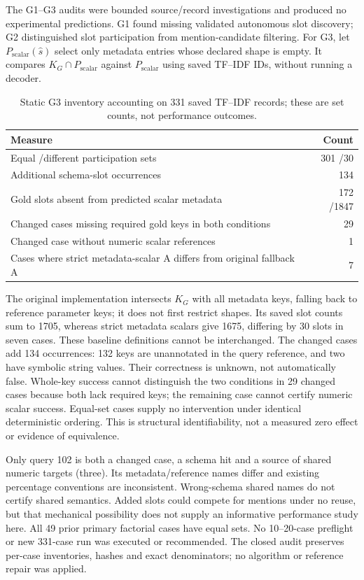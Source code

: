 The G1--G3 audits were bounded source/record investigations and produced no experimental predictions. G1 found missing validated autonomous slot discovery; G2 distinguished slot participation from mention-candidate filtering. For G3, let $P_{\mathrm{scalar}}(\hat{s})$ select only metadata entries whose declared shape is empty. It compares $K_G\cap P_{\mathrm{scalar}}$ against $P_{\mathrm{scalar}}$ using saved TF--IDF IDs, without running a decoder.

\begin{table}[htbp]\centering\small
\caption{Static G3 inventory accounting on 331 saved TF--IDF records; these are set counts, not performance outcomes.}\label{tab:g3-inventory}
\begin{tabularx}{\linewidth}{@{}Xr@{}}\toprule
Measure & Count\\\midrule
Equal /different participation sets &301 /30\\
Additional schema-slot occurrences &134\\
Gold slots absent from predicted scalar metadata &172 /1847\\
Changed cases missing required gold keys in both conditions &29\\
Changed case without numeric scalar references &1\\
Cases where strict metadata-scalar A differs from original fallback A &7\\\bottomrule
\end{tabularx}\end{table}

The original implementation intersects $K_G$ with all metadata keys, falling back to reference parameter keys; it does not first restrict shapes. Its saved slot counts sum to 1705, whereas strict metadata scalars give 1675, differing by 30 slots in seven cases. These baseline definitions cannot be interchanged. The changed cases add 134 occurrences: 132 keys are unannotated in the query reference, and two have symbolic string values. Their correctness is unknown, not automatically false. Whole-key success cannot distinguish the two conditions in 29 changed cases because both lack required keys; the remaining case cannot certify numeric scalar success. Equal-set cases supply no intervention under identical deterministic ordering. This is structural identifiability, not a measured zero effect or evidence of equivalence.

Only query 102 is both a changed case, a schema hit and a source of shared numeric targets (three). Its metadata/reference names differ and existing percentage conventions are inconsistent. Wrong-schema shared names do not certify shared semantics. Added slots could compete for mentions under no reuse, but that mechanical possibility does not supply an informative performance study here. All 49 prior primary factorial cases have equal sets. No 10--20-case preflight or new 331-case run was executed or recommended. The closed audit preserves per-case inventories, hashes and exact denominators; no algorithm or reference repair was applied.
